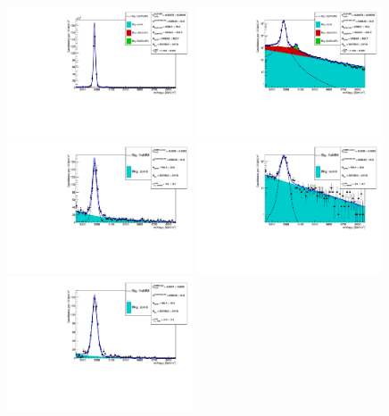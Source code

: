 \begin{figure}[h!]
\centering
\includegraphics[width=0.49\textwidth]{RKst/figs/Fit/fit_MM/KstJPsMM.pdf}
\includegraphics[width=0.49\textwidth]{RKst/figs/Fit/fit_MM/KstJPsMM_log.pdf}
\includegraphics[width=0.49\textwidth]{RKst/figs/Fit/fit_MM/KstMM_central.pdf}
\includegraphics[width=0.49\textwidth]{RKst/figs/Fit/fit_MM/KstMM_central_log.pdf}
\includegraphics[width=0.49\textwidth]{RKst/figs/Fit/fit_MM/KstMM_high.pdf}

\end{figure}
